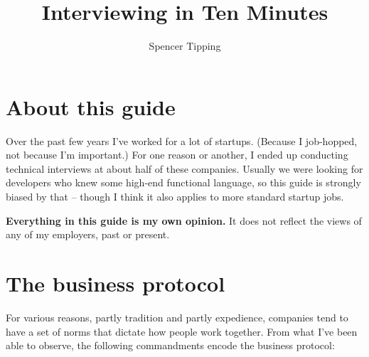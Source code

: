 \documentclass{article}
\title{Interviewing in Ten Minutes}
\author{Spencer Tipping}
\begin{document}
\maketitle{}
\tableofcontents{}

\section*{About this guide}
Over the past few years I've worked for a lot of startups. (Because I
job-hopped, not because I'm important.) For one reason or another, I ended up
conducting technical interviews at about half of these companies. Usually we
were looking for developers who knew some high-end functional language, so
this guide is strongly biased by that -- though I think it also applies to
more standard startup jobs.

{\bf Everything in this guide is my own opinion.} It does not reflect the
views of any of my employers, past or present.

\section{The business protocol}\label{sec:business-protocol}
  For various reasons, partly tradition and partly expedience, companies tend
  to have a set of norms that dictate how people work together. From what I've
  been able to observe, the following commandments encode the business
  protocol:
\end{document}
